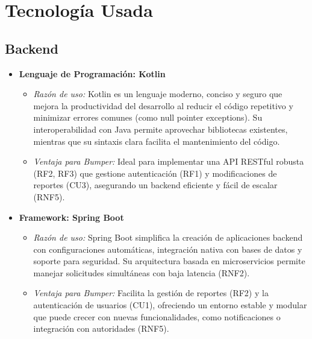 \section{Tecnología Usada}


\subsection*{Backend}
\begin{itemize}
    \item \textbf{Lenguaje de Programación: Kotlin}
    \begin{itemize}
        \item \textit{Razón de uso:} Kotlin es un lenguaje moderno, conciso y seguro que mejora la productividad del desarrollo al reducir el código repetitivo y minimizar errores comunes (como null pointer exceptions). Su interoperabilidad con Java permite aprovechar bibliotecas existentes, mientras que su sintaxis clara facilita el mantenimiento del código.
        \item \textit{Ventaja para Bumper:} Ideal para implementar una API RESTful robusta (RF2, RF3) que gestione autenticación (RF1) y modificaciones de reportes (CU3), asegurando un backend eficiente y fácil de escalar (RNF5).
    \end{itemize}
    \item \textbf{Framework: Spring Boot}
    \begin{itemize}
        \item \textit{Razón de uso:} Spring Boot simplifica la creación de aplicaciones backend con configuraciones automáticas, integración nativa con bases de datos y soporte para seguridad. Su arquitectura basada en microservicios permite manejar solicitudes simultáneas con baja latencia (RNF2).
        \item \textit{Ventaja para Bumper:} Facilita la gestión de reportes (RF2) y la autenticación de usuarios (CU1), ofreciendo un entorno estable y modular que puede crecer con nuevas funcionalidades, como notificaciones o integración con autoridades (RNF5).
    \end{itemize}
\end{itemize}

